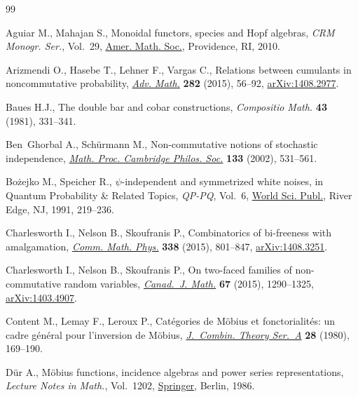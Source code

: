 \documentclass[pdftex]{sigma}
\numberwithin{equation}{section}
\begin{document}
\begin{thebibliography}{99}
\footnotesize\itemsep=0pt

Aguiar M., Mahajan S., Monoidal functors, species and {H}opf algebras,
 \textit{CRM Monogr. Ser.}, Vol.~29, \href{https://doi.org/10.1090/crmm/029}{Amer. Math. Soc.}, Providence, RI, 2010.

Arizmendi O., Hasebe T., Lehner F., Vargas C., Relations between cumulants in
 noncommutative probability, \href{https://doi.org/10.1016/j.aim.2015.03.029}{\textit{Adv. Math.}} \textbf{282} (2015), 56--92,
 \href{https://arxiv.org/abs/1408.2977}{arXiv:1408.2977}.

Baues H.J., The double bar and cobar constructions, \textit{Compositio Math.}
 \textbf{43} (1981), 331--341.

Ben~Ghorbal A., Sch\"urmann M., Non-commutative notions of stochastic
 independence, \href{https://doi.org/10.1017/S0305004102006072}{\textit{Math. Proc. Cambridge Philos. Soc.}} \textbf{133}
 (2002), 531--561.

Bo\.zejko M., Speicher R., $\psi$-independent and symmetrized white noises, in
 Quantum Probability \& Related Topics, \textit{QP-PQ}, Vol.~6, \href{https://doi.org/10.1142/9789814360203_0013}{World Sci.
 Publ.}, River Edge, NJ, 1991, 219--236.

Charlesworth I., Nelson B., Skoufranis P., Combinatorics of bi-freeness with
 amalgamation, \href{https://doi.org/10.1007/s00220-015-2326-8}{\textit{Comm. Math. Phys.}} \textbf{338} (2015), 801--847,
 \href{https://arxiv.org/abs/1408.3251}{arXiv:1408.3251}.

Charlesworth I., Nelson B., Skoufranis P., On two-faced families of
 non-commutative random variables, \href{https://doi.org/10.4153/CJM-2015-002-6}{\textit{Canad.~J. Math.}} \textbf{67}
 (2015), 1290--1325, \href{https://arxiv.org/abs/1403.4907}{arXiv:1403.4907}.

Content M., Lemay F., Leroux P., Cat\'egories de {M}\"obius et
 fonctorialit\'es: un cadre g\'en\'eral pour l'inversion de {M}\"obius,
 \href{https://doi.org/10.1016/0097-3165(80)90083-7}{\textit{J.~Combin. Theory Ser.~A}} \textbf{28} (1980), 169--190.

D\"ur A., M\"obius functions, incidence algebras and power series
 representations, \textit{Lecture Notes in Math.}, Vol.~1202, \href{https://doi.org/10.1007/BFb0077472}{Springer},
 Berlin, 1986.


\end{thebibliography}
\end{document}
